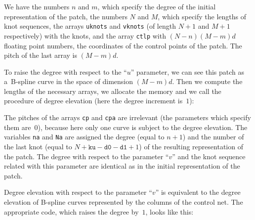 We have the numbers $n$ and $m$, which specify the degree of the initial
representation of the patch, the numbers $N$ and $M$, which specify the
lengths of knot sequences, the arrays \texttt{uknots} and \texttt{vknots}
(of length $N+1$ and $M+1$ respectively) with the knots, and the array
\texttt{ctlp} with $(N-n)(M-m)d$ floating point numbers, the coordinates of
the control points of the patch. The pitch of the last array is
$(M-m)d$.

To raise the degree with respect to the ``$u$'' parameter, we can see this
patch as a~B-spline curve in the space of dimension $(M-m)d$. Then we
compute the lengths of the necessary arrays, we allocate the memory and
we call the procedure of degree elevation (here the degree increment is~$1$):

\vspace{\medskipamount}
\vspace{\medskipamount}

The pitches of the arrays \texttt{cp} and \texttt{cpa} are irrelevant
(the parameters which specify them are~$0$), because here only one curve
is subject to the degree elevation. The variables \texttt{na} and \texttt{Na}
are assigned the degree (equal to $n+1$) and the number of the last
knot (equal to
$N+\mathord{\texttt{ku}}-\mathord{\texttt{d0}}-\mathord{\texttt{d1}}+1$)
of the resulting representation of the patch. The degree with respect to the
parameter ``$v$'' and the knot sequence related with this parameter are identical
as in the initial representation of the patch.

Degree elevation with respect to the parameter ``$v$'' is equivalent to
the degree elevation of B-spline curves represented by the columns of the
control net. The appropriate code, which raises the degree by~$1$,
looks like this:


